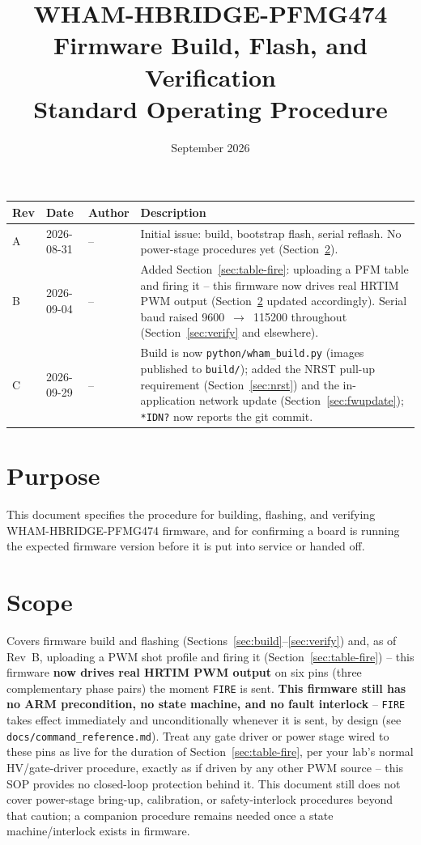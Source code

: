 \documentclass[11pt]{article}
\title{WHAM-HBRIDGE-PFMG474\\ \large Firmware Build, Flash, and Verification \\ Standard Operating Procedure}
\author{}
\date{September 2026}
\newcommand{\code}[1]{\texttt{#1}}
\begin{document}
\maketitle

\begin{center}
\begin{tabular}{p{0.45in} p{0.75in} p{0.5in} p{2.7in}}
  \hline
  \textbf{Rev} & \textbf{Date} & \textbf{Author} & \textbf{Description} \\
  \hline
  A & 2026-08-31 & -- & Initial issue: build, bootstrap flash, serial
    reflash. No power-stage procedures yet (Section~\ref{sec:scope}). \\
  B & 2026-09-04 & -- & Added Section~\ref{sec:table-fire}: uploading a
    PFM table and firing it -- this firmware now drives real HRTIM PWM
    output (Section~\ref{sec:scope} updated accordingly). Serial baud
    raised 9600~$\to$~115200 throughout (Section~\ref{sec:verify} and
    elsewhere). \\
  C & 2026-09-29 & -- & Build is now \code{python/wham\_build.py}
    (images published to \code{build/}); added the NRST pull-up requirement
    (Section~\ref{sec:nrst}) and the in-application network update
    (Section~\ref{sec:fwupdate}); \code{*IDN?} now reports the git
    commit. \\
  \hline
\end{tabular}
\end{center}

\section{Purpose}

This document specifies the procedure for building, flashing, and
verifying WHAM-HBRIDGE-PFMG474 firmware, and for confirming a board is
running the expected firmware version before it is put into service or
handed off.

\section{Scope}
\label{sec:scope}

Covers firmware build and flashing (Sections~\ref{sec:build}--\ref{sec:verify})
and, as of Rev~B, uploading a PWM shot profile and firing it
(Section~\ref{sec:table-fire}) -- this firmware \textbf{now drives real
HRTIM PWM output} on six pins (three complementary phase pairs) the
moment \code{FIRE} is sent. \textbf{This firmware still has no ARM
precondition, no state machine, and no fault interlock} -- \code{FIRE}
takes effect immediately and unconditionally whenever it is sent, by
design (see \code{docs/command\_reference.md}). Treat any gate driver or
power stage wired to these pins as live for the duration of
Section~\ref{sec:table-fire}, per your lab's normal HV/gate-driver
procedure, exactly as if driven by any other PWM source -- this SOP
provides no closed-loop protection behind it. This document still does
not cover power-stage bring-up, calibration, or safety-interlock
procedures beyond that caution; a companion procedure remains needed
once a state machine/interlock exists in firmware.
\end{document}
